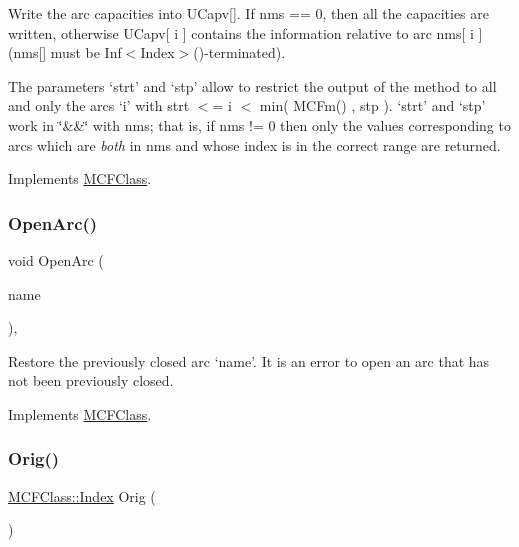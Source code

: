 Write the arc capacities into U\+Capv\mbox{[}\mbox{]}. If nms == 0, then all the capacities are written, otherwise U\+Capv\mbox{[} i \mbox{]} contains the information relative to arc nms\mbox{[} i \mbox{]} (nms\mbox{[}\mbox{]} must be Inf$<$\+Index$>$()-\/terminated).

The parameters `strt' and `stp' allow to restrict the output of the method to all and only the arcs `i' with strt $<$= i $<$ min( M\+C\+Fm() , stp ). `strt' and `stp' work in \char`\"{}\&\&\char`\"{} with nms; that is, if nms != 0 then only the values corresponding to arcs which are {\itshape both} in nms and whose index is in the correct range are returned. 

Implements \mbox{\hyperlink{class_m_c_f_class_a999b9738aa5cb925c5b4a799ed6d4838}{M\+C\+F\+Class}}.

\mbox{\label{class_s_p_tree_af8adf5d3a1f9dfb9c2dd30c170663136}} 
\subsubsection{\texorpdfstring{Open\+Arc()}{OpenArc()}}
{\footnotesize\ttfamily void Open\+Arc (\begin{DoxyParamCaption}\item[{\mbox{\hyperlink{class_m_c_f_class_a76aaabb20535c51a2752b93f6c38fe54}{c\+Index}}}]{name }\end{DoxyParamCaption})\hspace{0.3cm}{\ttfamily [override]}, {\ttfamily [virtual]}}

Restore the previously closed arc `name'. It is an error to open an arc that has not been previously closed. 

Implements \mbox{\hyperlink{class_m_c_f_class_ab902a23d1c9520a22b79de5d451c3348}{M\+C\+F\+Class}}.

\mbox{\label{class_s_p_tree_ae75a8a94d994b6a98934b241c969bdc6}} 
\subsubsection{\texorpdfstring{Orig()}{Orig()}}
{\footnotesize\ttfamily \mbox{\hyperlink{class_m_c_f_class_ad53d6229d7ec28555a9c9c2fd9abf773}{M\+C\+F\+Class\+::\+Index}} Orig (\begin{DoxyParamCaption}\item[{void}]{ }\end{DoxyParamCaption})\hspace{0.3cm}{\ttfamily [inline]}}

